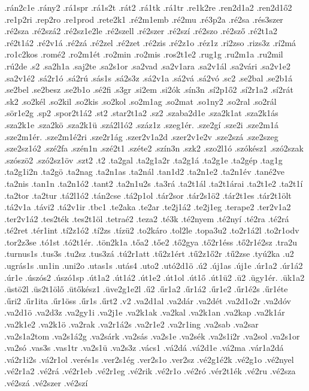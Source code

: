 {.rán2c1e
.rány2
.rá1spr
.rá1s2t
.rát2
.rá1tk
.rá1tr
.re1k2re
.ren2d1a2
.ren2d1ő2
.re1p2ri
.rep2ro
.re1prod
.rete2k1
.ré2m1emb
.ré2mu
.ré3p2a
.ré2sa
.rés3szer
.ré2sza
.ré2szá2
.ré2sz1e2le
.ré2szell
.ré2szer
.ré2szí
.ré2szo
.ré2sző
.ré2t1a2
.ré2t1á2
.ré2v1á
.ré2zá
.ré2zel
.ré2zet
.ré2zis
.ré2z1o
.réz1z
.ri2zso
.rizs3z
.rí2má
.ro1c2kos
.romé2
.ro2m1ét
.ro2min
.ro2mis
.ros2t1e2
.rug1g
.ru2m1a
.ru2mil
.rú2de
.s2
.sa2h1a
.saj2te
.sa2s1or
.sa2vad
.sa2v1ara
.sa2v1ál
.sa2vári
.sa2v1e2
.sa2v1é2
.sá2r1ó
.sá2rú
.sás1s
.sá2s3z
.sá2v1a
.sá2vá
.sá2vó
.sc2
.se2bal
.se2b1á
.se2bel
.se2besz
.se2b1o
.sé2fi
.s3gr
.si2em
.si2ók
.sín3n
.sí2p1ő2
.sí2r1a2
.sí2rát
.sk2
.so2kél
.so2kil
.so2kis
.so2kol
.so2m1ag
.so2mat
.so1ny2
.so2ral
.so2rál
.sör1e2g
.sp2
.spor2t1á2
.st2
.star2t1a2
.sz2
.szaba2d1e
.sza2k1at
.sza2k1ás
.sza2k1e
.sza2kö
.sza2k1ü
.szá2l1ó2
.száz1z
.szeg1ér.
.sze2gí
.sze2i
.sze2m1á
.sze2m1ér.
.sze2m1é2ri
.sze2r1ág
.szer2v1a2d
.szer2v1e2v
.sze2szá
.sze2szeg
.sze2sz1ó2
.szé2fa
.szén1n
.szé2t1
.széte2
.szín3n
.szk2
.szo2l1ó
.szókész1
.szó2szak
.szószö2
.szó2sz1öv
.szt2
.t2
.ta2gal
.ta2g1a2r
.ta2g1á
.ta2g1e
.ta2gép
.tag1g
.ta2g1i2n
.ta2gö
.ta2nag
.ta2n1as
.ta2nál
.tan1d2
.ta2n1e2
.ta2n1év
.tané2ve
.ta2nis
.tan1n
.ta2n1ó2
.tant2
.ta2n1u2s
.ta3rá
.ta2t1ál
.ta2t1árai
.ta2t1e2
.ta2t1í
.ta2tor
.ta2tur
.tá2l1ó2
.tán2cse
.tá2p1ol
.tár2sor
.tár2s1ö2
.tár2t1es
.tár2t1ölt
.tá2v1a
.távi2
.tá2v1ir
.tbc1
.te2aka
.te2ar
.te2j1á2
.te2j1eg
.terape2
.ter2v1a2
.ter2v1á2
.tes2ték
.tes2t1öl
.tetraé2
.teza2
.té3k
.té2nyem
.té2nyí
.té2ra
.té2rá
.té2ret
.tér1int
.tí2z1ó2
.tí2zs
.tízü2
.to2káro
.tol2le
.topa3u2
.to2r1á2l
.to2r1odv
.tor2z3se
.tó1st
.tó2t1ér.
.tön2k1a
.tőa2
.tőe2
.tő2gya
.tő2r1éss
.tő2r1é2sz
.tra2u
.turnus1s
.tus3s
.tu2sz
.tus3zá
.tú2r1att
.tű2z1ért
.tű2z1ő2r
.tű2zse
.tyú2ka
.u2
.ugrás1s
.un1in
.uni2o
.utas1s
.utás4
.uto2
.utó2d1ö
.ú2
.új1as
.új1e
.úr1a2
.úr1á2
.úr1e
.úszós2
.úszó1sp
.út1a2
.út1á2
.út1e2
.út1ol
.út1ő
.út1ü2
.ü2
.ügy1ér.
.ük1a2
.üstö2l
.üs2t1ölő
.ütőkész1
.üve2g1e2l
.ű2
.űr1a2
.űr1á2
.űr1e2
.űr1é2s
.űr1éte
.űri2
.űr1ita
.űr1öss
.űr1s
.űrt2
.v2
.va2d1al
.va2dár
.va2dét
.va2d1o2r
.va2dóv
.va2d1ö
.va2d3z
.va2gy1i
.va2j1e
.va2k1ak
.va2kal
.va2k1an
.va2kap
.va2k1ár
.va2k1e2
.va2k1ö
.va2rak
.va2r1á2s
.va2r1e2
.va2r1ing
.va2sab
.va2sar
.va2s1a2tom
.va2s1á2g
.va2sárk
.va2sás
.va2s1e
.va2sék
.va2s1i2r
.va2sol
.va2s1or
.va2só
.vas3s
.vas1tr
.va2s1ü
.va2s3z
.vács1
.vá2dá
.vá2d1e
.vá2ma
.vár1a2dá
.vá2r1i2s
.vá2r1ol
.verés1s
.ver2s1ég
.ver2s1o
.ver2sz
.vé2g1é2k
.vé2g1o
.vé2nyel
.vé2r1a2
.vé2rá
.vé2r1eb
.vé2r1eg
.vé2rik
.vé2r1o
.vé2ró
.vér2t1ék
.vé2ru
.vé2sza
.vé2szá
.vé2szer
.vé2szí
}
